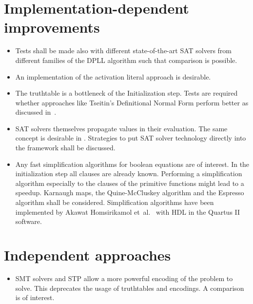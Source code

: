 \section{Implementation-dependent improvements}
%
\begin{itemize}
  \item Tests shall be made also with different state-of-the-art SAT solvers from different families of the DPLL algorithm such that comparison is possible.
  \item An implementation of the activation literal approach is desirable.
  \item The truthtable is a bottleneck of the Initialization step. Tests are required whether approaches like Tseitin's Definitional Normal Form perform better as discussed in~\cite{Sat03}.
  \item SAT solvers themselves propagate values in their evaluation. The same concept is desirable in \nltool. Strategies to put SAT solver technology directly into the framework shall be discussed.
  \item Any fast simplification algorithms for boolean equations are of interest. In the initialization step all clauses are already known. Performing a simplification algorithm especially to the clauses of the primitive functions might lead to a speedup. Karnaugh maps, the Quine-McCluskey algorithm and the Espresso algorithm shall be considered. Simplification algorithms have been implemented by Akawat Homsirikamol et~al.~\cite{Cry04} with HDL in the Quartus II software.
\end{itemize}

\section{Independent approaches}
%
\begin{itemize}
  \item SMT solvers and STP allow a more powerful encoding of the problem to solve. This deprecates the usage of truthtables and encodings. A comparison is of interest.
\end{itemize}
